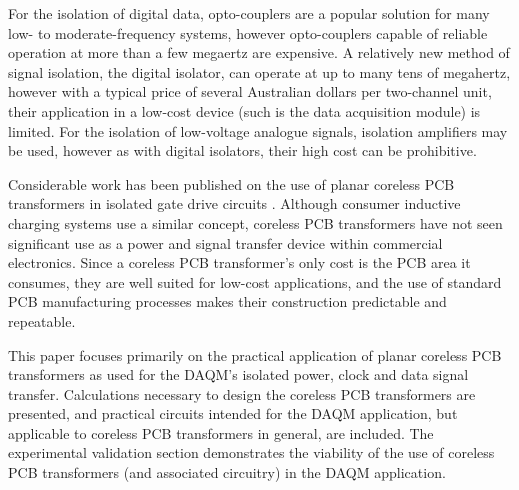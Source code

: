 \documentclass[conference]{IEEEtran}
\begin{document}
For the isolation of digital data, opto-couplers are a popular solution for many low- to moderate-frequency systems, however opto-couplers capable of reliable operation at more than a few megaertz are expensive.  A relatively new method of signal isolation, the digital isolator, can operate at up to many tens of megahertz, however with a typical price of several Australian dollars per two-channel unit, their application in a low-cost device (such is the data acquisition module) is limited.  For the isolation of low-voltage analogue signals, isolation amplifiers may be used, however as with digital isolators, their high cost can be prohibitive.

Considerable work has been published on the use of planar coreless PCB transformers in isolated gate drive circuits \cite{TangHuiFundamental,NaturallySoft,OptimalOperation,CorelessGateDrive}.  Although consumer inductive charging systems use a similar concept, coreless PCB transformers have not seen significant use as a power and signal transfer device within commercial electronics.  Since a coreless PCB transformer's only cost is the PCB area it consumes, they are well suited for low-cost applications, and the use of standard PCB manufacturing processes makes their construction predictable and repeatable.

This paper focuses primarily on the practical application of planar coreless PCB transformers as used for the DAQM's isolated power, clock and data signal transfer.  Calculations necessary to design the coreless PCB transformers are presented, and practical circuits intended for the DAQM application, but applicable to coreless PCB transformers in general, are included.  The experimental validation section demonstrates the viability of the use of coreless PCB transformers (and associated circuitry) in the DAQM application.
\end{document}
